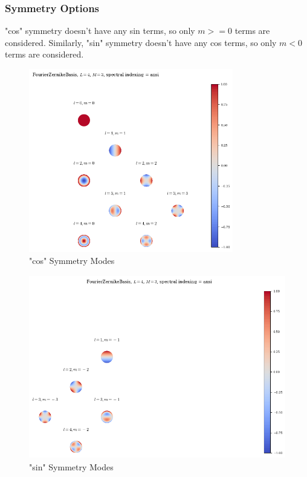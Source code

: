 






\subsubsection{Symmetry Options}
"cos" symmetry doesn't have any sin terms, so only $m>=0$ terms are considered. Similarly, "sin" symmetry doesn't have any cos terms, so only $m<0$ terms are considered.

\begin{minipage}[c][9cm][c]{\textwidth}
    \begin{minipage}[t][9cm][t]{0.45\textwidth}
        \begin{figure}[H]
            \centering
            \includegraphics[width=\textwidth,height=8cm,keepaspectratio]{figures/ansiL4M3cos.png}
            \caption{"cos" Symmetry Modes}
        \end{figure}
    \end{minipage}
    \begin{minipage}[t][9cm][t]{0.55\textwidth}
        \begin{figure}[H]
            \centering
            \includegraphics[width=\textwidth,height=8cm,keepaspectratio]{figures/ansiL4M3sin.png}
            \caption{"sin" Symmetry Modes}
        \end{figure}
    \end{minipage}
\end{minipage}

